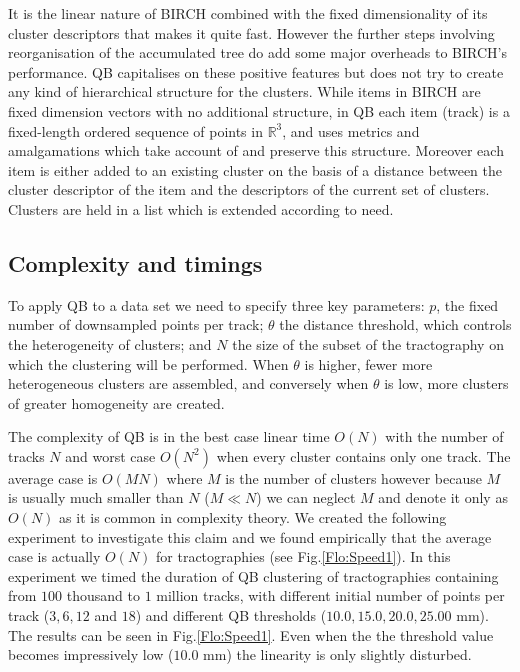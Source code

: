 \documentclass[preprint,authoryear,a4paper,10pt,onecolumn]{elsarticle}
\begin{document}
It is the linear nature of BIRCH combined with the fixed dimensionality
of its cluster descriptors that makes it quite fast. However the further
steps involving reorganisation of the accumulated tree do add some major
overheads to BIRCH's performance. QB capitalises on these positive
features but does not try to create any kind of hierarchical structure
for the clusters. While items in BIRCH are fixed dimension vectors with
no additional structure, in QB each item (track) is a fixed-length
ordered sequence of points in $\mathbb{R}^{3}$, and uses metrics and
amalgamations which take account of and preserve this structure.
Moreover each item is either added to an existing cluster on the basis
of a distance between the cluster descriptor of the item and the
descriptors of the current set of clusters. Clusters are held in a list
which is extended according to need.

\subsection{Complexity and timings\label{sub:Complexity}}

To apply QB to a data set we need to specify three key parameters:
$p$, the fixed number of downsampled points per track; $\theta$
the distance threshold, which controls the heterogeneity of clusters;
and $N$ the size of the subset of the tractography on which the clustering
will be performed. When $\theta$ is higher, fewer more heterogeneous
clusters are assembled, and conversely when $\theta$ is low, more
clusters of greater homogeneity are created.

The complexity of QB is in the best case linear time $O(N)$ with
the number of tracks $N$ and worst case $O(N^{2})$ when every cluster
contains only one track. The average case is $O(MN)$ where $M$ is
the number of clusters however because $M$ is usually much smaller
than $N$ ($M\ll N$) we can neglect $M$ and denote it only as $O(N)$
as it is common in complexity theory. We created the following experiment
to investigate this claim and we found empirically that the average
case is actually $O(N)$ for tractographies (see Fig.\ref{Flo:Speed1}).
In this experiment we timed the duration of QB clustering of tractographies
containing from $100$ thousand to $1$ million tracks, with different
initial number of points per track ($3,6,12$ and $18$) and different
QB thresholds ($10.0,15.0,20.0,25.00$ mm). The results can be seen
in Fig.\ref{Flo:Speed1}. Even when the the threshold value becomes impressively
low ($10.0$ mm) the linearity is only slightly disturbed.
\end{document}
